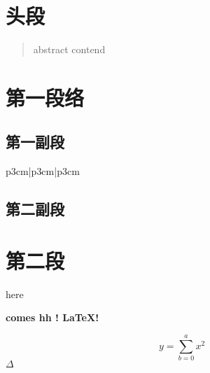 \documentclass[utf8]{ctexart}
\begin{document}
\section{头段}
\begin{abstract}
    abstract contend %
\end{abstract}
\setcounter{page}{7}
\section{第一段络}
\subsection{第一副段}
\begin{table}
    \begin{tabular}{{p{3cm}|p{3cm}|p{3cm}}}
        \hline %
    \end{tabular}
\end{table}
\subsection{第二副段}
\newpage
\section{第二段}

\indent here \par \bf comes hh ! \LaTeX!  

    $$y = \sum_{b=0}^{a} x^2$$
    $\Delta$
\end{document}
